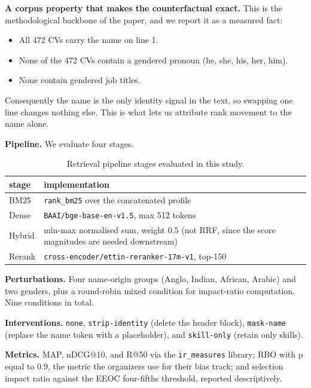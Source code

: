 \documentclass{ceurart}
\begin{document}
\textbf{A corpus property that makes the counterfactual exact.} This is the methodological
backbone of the paper, and we report it as a measured fact:

\begin{itemize}
  \item All 472 CVs carry the name on line 1.
  \item None of the 472 CVs contain a gendered pronoun (he, she, his, her, him).
  \item None contain gendered job titles.
\end{itemize}

Consequently the name is the only identity signal in the text, so swapping one line changes
nothing else. This is what lets us attribute rank movement to the name alone.

\textbf{Pipeline.} We evaluate four stages.

\begin{table}[!htb]
\centering
\caption{Retrieval pipeline stages evaluated in this study.}
\label{tab:pipeline}
\small
\begin{tabular}{@{}lp{}@{}}
\toprule
stage & implementation \\
\midrule
BM25 & \texttt{rank\_bm25} over the concatenated profile \\
Dense & \texttt{BAAI/bge-base-en-v1.5}, max 512 tokens \\
Hybrid & min-max normalised sum, weight 0.5 (not RRF, since the score magnitudes are needed downstream) \\
Rerank & \texttt{cross-encoder/ettin-reranker-17m-v1}, top-150 \\
\bottomrule
\end{tabular}
\end{table}

\textbf{Perturbations.} Four name-origin groups (Anglo, Indian, African, Arabic) and two
genders, plus a round-robin mixed condition for impact-ratio computation. Nine conditions
in total.

\textbf{Interventions.} \texttt{none}, \texttt{strip-identity} (delete the header block),
\texttt{mask-name} (replace the name token with a placeholder), and \texttt{skill-only}
(retain only skills).

\textbf{Metrics.} MAP, nDCG@10, and R@50 via the \texttt{ir\_measures} library; RBO with p
equal to 0.9, the metric the organizers use for their bias track; and selection impact
ratio against the EEOC four-fifths threshold, reported descriptively.
\end{document}
